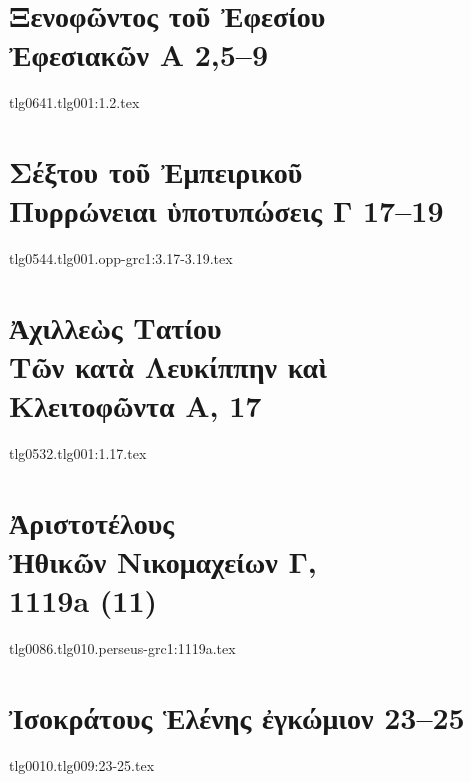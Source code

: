 \documentclass[a4paper,12pt,twoside]{report}
\begin{document}
\chapter[Ξενοφῶντος τοῦ Ἐφεσίου Ἐφεσιακῶν Α]{\textgreek[variant=ancient]{Ξενοφῶντος τοῦ Ἐφεσίου \\Ἐφεσιακῶν Α} 2,5–9}

{tlg0641.tlg001:1.2.tex}

\chapter[Σέξτου τοῦ Ἐμπειρικοῦ Πυρρώνειαι\dots\ Γ]{\textgreek[variant=ancient]{Σέξτου τοῦ Ἐμπειρικοῦ \\Πυρρώνειαι ὑποτυπώσεις Γ} 17–19}

{tlg0544.tlg001.opp-grc1:3.17-3.19.tex}


\chapter[Ἀχιλλεὼς Τατίου Τῶν κατὰ Λευκίππην\dots]{\textgreek[variant=ancient]{Ἀχιλλεὼς Τατίου \\Τῶν κατὰ Λευκίππην καὶ\\ Κλειτοφῶντα Α,} 17}

{tlg0532.tlg001:1.17.tex}



\chapter[Ἀριστοτέλους Ἠθικῶν Νικομαχείων Γ]{\textgreek[variant=ancient]{Ἀριστοτέλους \\Ἠθικῶν Νικομαχείων Γ,} \\1119a (11)}

{tlg0086.tlg010.perseus-grc1:1119a.tex}



\chapter[Ἰσοκράτους Ἑλένης ἐγκώμιον 23]{\textgreek[variant=ancient]{Ἰσοκράτους Ἑλένης ἐγκώμιον} 23–25}

{tlg0010.tlg009:23-25.tex}

\end{document}
